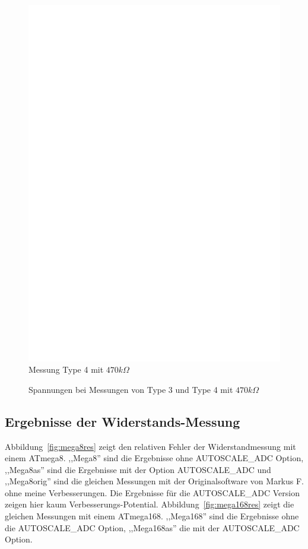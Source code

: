 \begin{figure}[H]
 \centering
 \includegraphics[]{../FIG/ResistormessH2.eps}
 \caption{Messung Type 4 mit \(470k\Omega\) }
\label{fig:RH2mes}
\end{figure}

\begin{figure}[H]
\centering

\caption{Spannungen bei Messungen von Type 3 und Type 4  mit \(470k\Omega\) }
\label{fig:RHv}
\end{figure}

\subsection{Ergebnisse der Widerstands-Messung}
Abbildung~\ref{fig:mega8res} zeigt den relativen Fehler der Widerstandmessung mit einem ATmega8. 
,,Mega8'' sind die Ergebnisse ohne AUTOSCALE\_ADC Option,
,,Mega8as'' sind die Ergebnisse mit der Option AUTOSCALE\_ADC und
,,Mega8orig'' sind die gleichen Messungen mit der Originalsoftware von Markus F. ohne meine Verbesserungen.
Die Ergebnisse f\"ur die AUTOSCALE\_ADC Version zeigen hier kaum Verbesserungs-Potential.
Abbildung~\ref{fig:mega168res} zeigt die gleichen Messungen mit einem ATmega168.
,,Mega168'' sind die Ergebnisse ohne die AUTOSCALE\_ADC Option, ,,Mega168as'' die mit der
 AUTOSCALE\_ADC Option.

